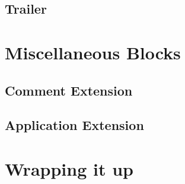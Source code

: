 \begin{refsection}
  \subsection{Trailer}

  \section{Miscellaneous Blocks}

  \subsection{Comment Extension}

  \subsection{Application Extension}

  \section{Wrapping it up}





  \printbibliography[heading=subbibliography]

\end{refsection}
